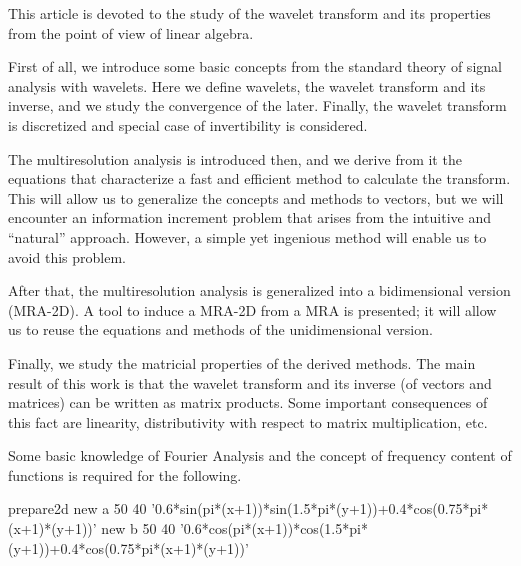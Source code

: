 \documentclass[letterpaper,10pt]{article}
\begin{document}
  \noindent This article is devoted to the study of the wavelet transform and its properties from the point of view of linear algebra.
  
  First of all, we introduce some basic concepts from the standard theory of signal analysis with wavelets. Here we define wavelets, the wavelet transform and its inverse, and we study the convergence of the later. Finally, the wavelet transform is discretized and special case of invertibility is considered.
  
  The multiresolution analysis is introduced then, and we derive from it the equations that characterize a fast and efficient method to calculate the transform. This will allow us to generalize the concepts and methods to vectors, but we will encounter an information increment problem that arises from the intuitive and ``natural'' approach. However, a simple yet ingenious method will enable us to avoid this problem.
  
  After that, the multiresolution analysis is generalized into a bidimensional version (MRA-2D). A tool to induce a MRA-2D from a MRA is presented; it will allow us to reuse the equations and methods of the unidimensional version.
  
  Finally, we study the matricial properties of the derived methods. The main result of this work is that the wavelet transform and its inverse (of vectors and matrices) can be written as matrix products. Some important consequences of this fact are linearity, distributivity with respect to matrix multiplication, etc.
  \begin{figure}[!ht]
    \centering
  \end{figure}
  
  Some basic knowledge of Fourier Analysis and the concept of frequency content of functions is required for the following.
  
  
  \begin{mglfunc}{prepare2d}
    new a 50 40 '0.6*sin(pi*(x+1))*sin(1.5*pi*(y+1))+0.4*cos(0.75*pi*(x+1)*(y+1))'
    new b 50 40 '0.6*cos(pi*(x+1))*cos(1.5*pi*(y+1))+0.4*cos(0.75*pi*(x+1)*(y+1))'
  \end{mglfunc}
\end{document}
